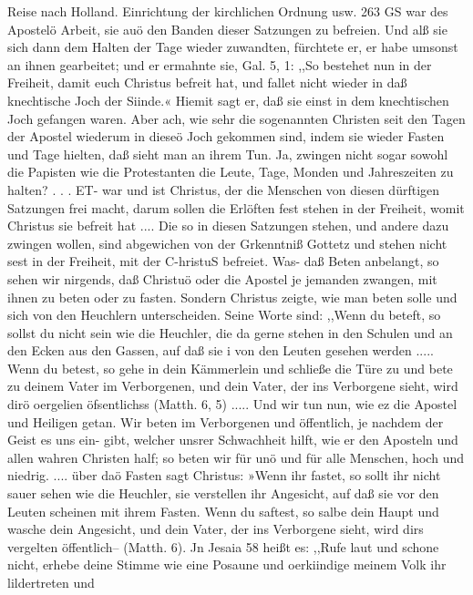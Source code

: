 Reise nach Holland. Einrichtung der kirchlichen Ordnung usw. 263
GS war des Apostelö Arbeit, sie auö den Banden dieser
Satzungen zu befreien. Und alß sie sich dann dem Halten der
Tage wieder zuwandten, fürchtete er, er habe umsonst an ihnen
gearbeitet; und er ermahnte sie, Gal. 5, 1: ,,So bestehet nun
in der Freiheit, damit euch Christus befreit hat, und fallet
nicht wieder in daß knechtische Joch der Siinde.« Hiemit sagt
er, daß sie einst in dem knechtischen Joch gefangen waren. Aber
ach, wie sehr die sogenannten Christen seit den Tagen der Apostel
wiederum in dieseö Joch gekommen sind, indem sie wieder Fasten
und Tage hielten, daß sieht man an ihrem Tun. Ja, zwingen
nicht sogar sowohl die Papisten wie die Protestanten die Leute,
Tage, Monden und Jahreszeiten zu halten? . . . ET- war und
ist Christus, der die Menschen von diesen dürftigen Satzungen frei
macht, darum sollen die Erlöften fest stehen in der Freiheit, womit
Christus sie befreit hat .... Die so in diesen Satzungen stehen, und
andere dazu zwingen wollen, sind abgewichen von der Grkenntniß
Gottetz und stehen nicht sest in der Freiheit, mit der C-hristuS befreiet.
Was- daß Beten anbelangt, so sehen wir nirgends, daß Christuö
oder die Apostel je jemanden zwangen, mit ihnen zu beten oder
zu fasten. Sondern Christus zeigte, wie man beten solle und sich
von den Heuchlern unterscheiden. Seine Worte sind: ,,Wenn du
beteft, so sollst du nicht sein wie die Heuchler, die da gerne stehen
in den Schulen und an den Ecken aus den Gassen, auf daß sie i
von den Leuten gesehen werden ..... Wenn du betest, so gehe
in dein Kämmerlein und schließe die Türe zu und bete zu deinem
Vater im Verborgenen, und dein Vater, der ins Verborgene sieht,
wird dirö oergelien öfsentlichss (Matth. 6, 5) ..... Und wir
tun nun, wie ez die Apostel und Heiligen getan. Wir beten im
Verborgenen und öffentlich, je nachdem der Geist es uns ein-
gibt, welcher unsrer Schwachheit hilft, wie er den Aposteln und
allen wahren Christen half; so beten wir für unö und für alle
Menschen, hoch und niedrig. .... über daö Fasten sagt
Christus: »Wenn ihr fastet, so sollt ihr nicht sauer sehen wie die
Heuchler, sie verstellen ihr Angesicht, auf daß sie vor den Leuten
scheinen mit ihrem Fasten. Wenn du saftest, so salbe dein Haupt
und wasche dein Angesicht, und dein Vater, der ins Verborgene
sieht, wird dirs vergelten öffentlich-- (Matth. 6). Jn Jesaia 58
heißt es: ,,Rufe laut und schone nicht, erhebe deine Stimme wie
eine Posaune und oerkiindige meinem Volk ihr lildertreten und


